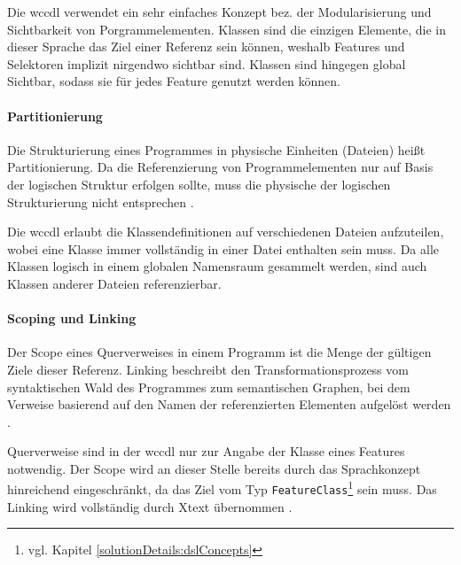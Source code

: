     Die \gls{wccdl} verwendet ein sehr einfaches Konzept bez.
    der Modularisierung und Sichtbarkeit von Porgrammelementen.
    Klassen sind die einzigen Elemente, die in dieser Sprache das Ziel einer Referenz
    sein können, weshalb Features und Selektoren implizit nirgendwo sichtbar sind.
    Klassen sind hingegen global Sichtbar,
    sodass sie für jedes Feature genutzt werden können.

    \paragraph{Partitionierung}
    Die Strukturierung eines Programmes in physische Einheiten (Dateien) heißt Partitionierung.
    Da die Referenzierung von Programmelementen nur auf Basis der logischen Struktur erfolgen sollte,
    muss die physische der logischen Strukturierung nicht entsprechen
    \cite[Kapitel 5.1.2]{voelter:DslEngineering}.

    Die \gls{wccdl} erlaubt die Klassendefinitionen auf verschiedenen Dateien
    aufzuteilen, wobei eine Klasse immer vollständig in einer Datei enthalten sein muss.
    Da alle Klassen logisch in einem globalen Namensraum gesammelt werden,
    sind auch Klassen anderer Dateien referenzierbar.

    \paragraph{Scoping und Linking}
    Der Scope eines Querverweises in einem Programm ist die Menge der
    gültigen Ziele dieser Referenz.
    Linking beschreibt den Transformationsprozess vom syntaktischen Wald des Programmes
    zum semantischen Graphen, bei dem Verweise basierend auf den Namen der referenzierten
    Elementen aufgelöst werden
    \cite[Kapitel 8]{voelter:DslEngineering}.

    Querverweise sind in der \gls{wccdl} nur zur Angabe der Klasse eines Features notwendig.
    Der Scope wird an dieser Stelle bereits durch das Sprachkonzept hinreichend
    eingeschränkt, da das Ziel vom Typ
    \texttt{FeatureClass}\footnote{vgl. Kapitel \ref{solutionDetails:dslConcepts}} sein muss.
    Das Linking wird vollständig durch Xtext übernommen
    \cite[Kapitel "`Language Implementation"']{xtext:documentation}.
    

